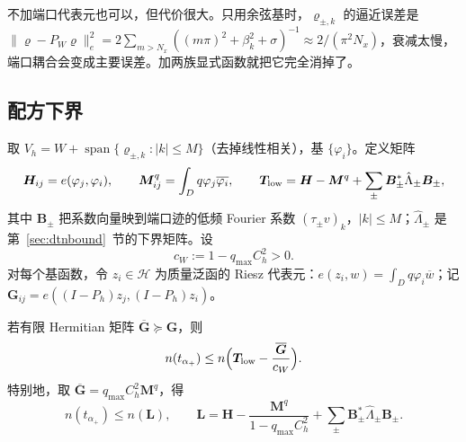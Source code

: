 \documentclass[11pt,a4paper,fontset=fandol]{ctexart}
\begin{document}
\begin{remark}
不加端口代表元也可以，但代价很大。只用余弦基时，$\varrho_{\pm,k}$ 的逼近误差是 $\|\varrho-P_W\varrho\|_e^2=2\sum_{m>N_x}((m\pi)^2+\beta_k^2+\sigma)^{-1}\approx2/(\pi^2N_x)$，衰减太慢，端口耦合会变成主要误差。加两族显式函数就把它完全消掉了。
\end{remark}

\subsection{配方下界}

取 $V_h=W+\operatorname{span}\{\varrho_{\pm,k}:|k|\le M\}$（去掉线性相关），基 $\{\varphi_i\}$。定义矩阵
\[
\bm H_{ij}=e(\varphi_j,\varphi_i),\qquad \bm M^q_{ij}=\int_Dq\varphi_j\overline{\varphi_i},\qquad
\bm T_{\rm low}=\bm H-\bm M^q+\sum_\pm\bm B_\pm^*\hat\Lambda_\pm\bm B_\pm ,
\]
其中 $\bm B_\pm$ 把系数向量映到端口迹的低频 Fourier 系数 $(\tau_\pm v)_k$，$|k|\le M$；$\hat\Lambda_\pm$ 是第~\ref{sec:dtnbound}~节的下界矩阵。设
\[
c_W:=1-q_{\max}C_h^2>0 .
\]
对每个基函数，令 $z_i\in\mathcal H$ 为质量泛函的 Riesz 代表元：$e(z_i,w)=\int_Dq\varphi_i\overline w$；记 $\bm G_{ij}=e((I-P_h)z_j,(I-P_h)z_i)$。

\begin{theorem}[芯区下界]
\label{thm:core-lower}
若有限 Hermitian 矩阵 $\overline{\bm G}\succeq\bm G$，则
\[
n(t_{\alpha_+})\le n\Bigl(\bm T_{\rm low}-\frac{\overline{\bm G}}{c_W}\Bigr).
\]
特别地，取 $\overline{\bm G}=q_{\max}C_h^2\bm M^q$，得
\begin{equation}
\label{eq:L-scalar}
n(t_{\alpha_+})\le n(\bm L),\qquad \bm L=\bm H-\frac{\bm M^q}{1-q_{\max}C_h^2}+\sum_\pm\bm B_\pm^*\hat\Lambda_\pm\bm B_\pm .
\end{equation}
\end{theorem}
\end{document}
